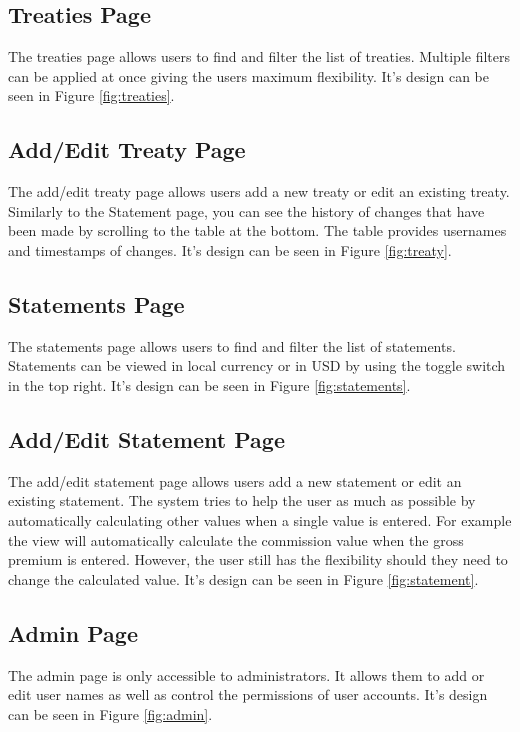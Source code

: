 \documentclass[12pt]{article}
\begin{document}
\subsection{Treaties Page}
The treaties page allows users to find and filter the list of treaties. Multiple filters can be applied at once giving the users maximum flexibility. It's design can be seen in Figure \ref{fig:treaties}.

\subsection{Add/Edit Treaty Page}
The add/edit treaty page allows users add a new treaty or edit an existing treaty. Similarly to the Statement page, you can see the history of changes that have been made by scrolling to the table at the bottom. The table provides usernames and timestamps of changes. It's design can be seen in Figure \ref{fig:treaty}.

\subsection{Statements Page}
The statements page allows users to find and filter the list of statements. Statements can be viewed in local currency or in USD by using the toggle switch in the top right. It's design can be seen in Figure \ref{fig:statements}.

\subsection{Add/Edit Statement Page}
The add/edit statement page allows users add a new statement or edit an existing statement. The system tries to help the user as much as possible by automatically calculating other values when a single value is entered. For example the view will automatically calculate the commission value when the gross premium is entered. However, the user still has the flexibility should they need to change the calculated value. It's design can be seen in Figure \ref{fig:statement}.

\subsection{Admin Page}
The admin page is only accessible to administrators. It allows them to add or edit user names as well as control the permissions of user accounts. It's design can be seen in Figure \ref{fig:admin}.
\end{document}

